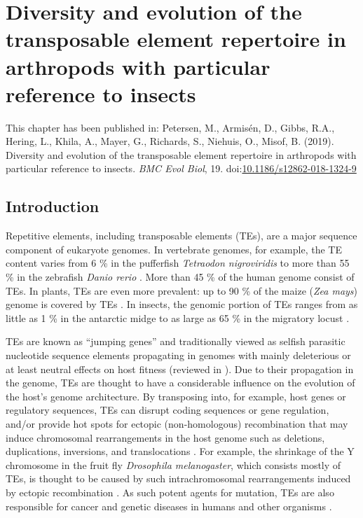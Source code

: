 
\chapter{Diversity and evolution of the transposable element repertoire
in arthropods with particular reference to insects} \label{cha:mobilome}

\newpage

This chapter has been published in:
Petersen, M., Armis\'en, D., Gibbs, R.A., Hering, L., Khila, A., Mayer, G.,
Richards, S., Niehuis, O.,  Misof, B. (2019). Diversity and evolution of the
transposable element repertoire in arthropods with particular reference to
insects. \emph{BMC Evol Biol}, 19.
doi:\href{https://dx.doi.org/10.1186/s12862-018-1324-9}{10.1186/s12862-018-1324-9}


\section{Introduction}

Repetitive elements, including transposable elements (TEs), are a major
sequence component of eukaryote genomes. In vertebrate genomes, for
example, the TE content varies from 6 \% in the pufferfish
\emph{Tetraodon nigroviridis} to more than 55 \% in the zebrafish
\emph{Danio rerio} \citep{Chalopin2015}. More than 45 \% of the human
genome \citep{deKoning2011} consist of TEs. In plants, TEs are even more
prevalent: up to 90 \% of the maize (\emph{Zea mays}) genome is covered
by TEs \citep{SanMiguel1996}. In insects, the genomic portion of TEs
ranges from as little as 1 \% in the antarctic midge \citep{Kelley2014}
to as large as 65 \% in the migratory locust \citep{Wang2014}.

TEs are known as ``jumping genes'' and traditionally viewed as selfish
parasitic nucleotide sequence elements propagating in genomes with
mainly deleterious or at least neutral effects on host fitness
\citep{Mackay1989, Pasyukova2004} (reviewed in \citet{Barron2014}). Due
to their propagation in the genome, TEs are thought to have a
considerable influence on the evolution of the host's genome
architecture. By transposing into, for example, host genes or regulatory
sequences, TEs can disrupt coding sequences or gene regulation, and/or
provide hot spots for ectopic (non-homologous) recombination that may
induce chromosomal rearrangements in the host genome such as deletions,
duplications, inversions, and translocations \citep{Burns2012}. For
example, the shrinkage of the Y chromosome in the fruit fly
\emph{Drosophila melanogaster}, which consists mostly of TEs, is thought
to be caused by such intrachromosomal rearrangements induced by ectopic
recombination \citep{Adams2000, Kent2017}. As such potent agents for
mutation, TEs are also responsible for cancer and genetic diseases in
humans and other organisms
\citep{Vorechovsky2009,Chenais2015,Hancks2016}.

